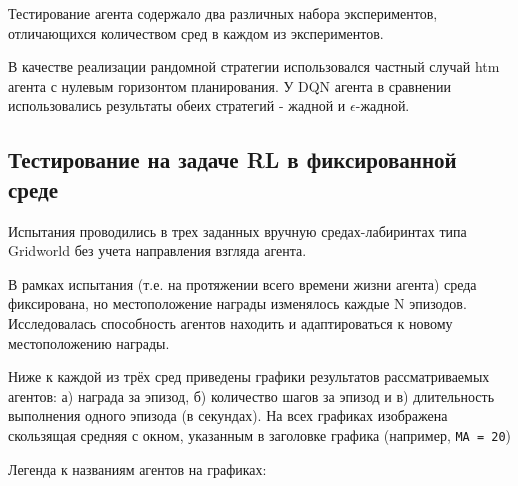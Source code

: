 \documentclass[a4paper]{article}
\begin{document}
Тестирование агента содержало два различных набора экспериментов, отличающихся количеством сред в каждом из экспериментов.

В качестве реализации рандомной стратегии использовался частный случай htm агента с нулевым горизонтом планирования. У DQN агента в сравнении использовались результаты обеих стратегий - жадной и $\epsilon$-жадной.


\subsection{Тестирование на задаче RL в фиксированной среде}

Испытания проводились в трех заданных вручную средах-лабиринтах типа Gridworld без учета направления взгляда агента.

В рамках испытания (т.е. на протяжении всего времени жизни агента) среда фиксирована, но местоположение награды изменялось каждые N эпизодов. Исследовалась способность агентов находить и адаптироваться к новому местоположению награды.

Ниже к каждой из трёх сред приведены графики результатов рассматриваемых агентов: а) награда за эпизод, б) количество шагов за эпизод и в) длительность выполнения одного эпизода (в секундах). На всех графиках изображена скользящая средняя с окном, указанным в заголовке графика (например, \verb|MA = 20|)

Легенда к названиям агентов на графиках:
\end{document}
